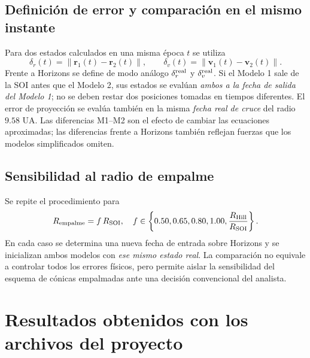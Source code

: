 \documentclass[11pt,a4paper]{article}
\newcommand{\vect}[1]{\bm{#1}}
\newcommand{\SOI}{R_{\mathrm{SOI}}}
\newcommand{\rV}{\vect r}
\newcommand{\vV}{\vect v}
\begin{document}
\subsection{Definición de error y comparación en el mismo instante}
Para dos estados calculados en una misma época $t$ se utiliza
\begin{equation}
\delta_r(t)=\lVert\rV_1(t)-\rV_2(t)\rVert,
\qquad \delta_v(t)=\lVert\vV_1(t)-\vV_2(t)\rVert.
\end{equation}
Frente a Horizons se define de modo análogo $\delta_r^{\rm real}$ y $\delta_v^{\rm real}$. Si el Modelo 1 sale de la SOI antes que el Modelo 2, sus estados se evalúan \emph{ambos a la fecha de salida del Modelo 1}; no se deben restar dos posiciones tomadas en tiempos diferentes. El error de proyección se evalúa también en la misma \emph{fecha real de cruce} del radio $9.58$ UA. Las diferencias M1--M2 son el efecto de cambiar las ecuaciones aproximadas; las diferencias frente a Horizons también reflejan fuerzas que los modelos simplificados omiten.

\subsection{Sensibilidad al radio de empalme}
Se repite el procedimiento para
\begin{equation}
R_{\rm empalme}=f\,\SOI,
\quad f\in\left\{0.50,0.65,0.80,1.00,\frac{R_{\rm Hill}}{\SOI}\right\}.
\end{equation}
En cada caso se determina una nueva fecha de entrada sobre Horizons y se inicializan ambos modelos con \emph{ese mismo estado real}. La comparación no equivale a controlar todos los errores físicos, pero permite aislar la sensibilidad del esquema de cónicas empalmadas ante una decisión convencional del analista.

\section{Resultados obtenidos con los archivos del proyecto}
\end{document}
